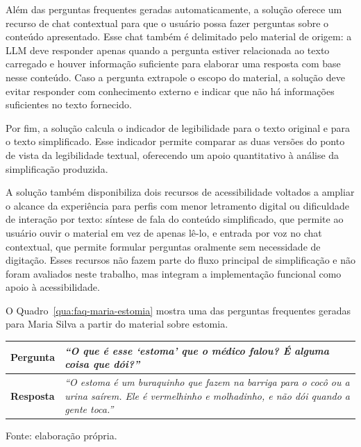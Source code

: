 Além das perguntas frequentes geradas automaticamente, a solução oferece um recurso de chat contextual para que o usuário possa fazer perguntas sobre o conteúdo apresentado. Esse chat também é delimitado pelo material de origem: a LLM deve responder apenas quando a pergunta estiver relacionada ao texto carregado e houver informação suficiente para elaborar uma resposta com base nesse conteúdo. Caso a pergunta extrapole o escopo do material, a solução deve evitar responder com conhecimento externo e indicar que não há informações suficientes no texto fornecido. 

Por fim, a solução calcula o indicador de legibilidade para o texto original e para o texto simplificado. Esse indicador permite comparar as duas versões do ponto de vista da legibilidade textual, oferecendo um apoio quantitativo à análise da simplificação produzida.

A solução também disponibiliza dois recursos de acessibilidade voltados a ampliar o alcance da experiência para perfis com menor letramento digital ou dificuldade de interação por texto: síntese de fala do conteúdo simplificado, que permite ao usuário ouvir o material em vez de apenas lê-lo, e entrada por voz no chat contextual, que permite formular perguntas oralmente sem necessidade de digitação. Esses recursos não fazem parte do fluxo principal de simplificação e não foram avaliados neste trabalho, mas integram a implementação funcional como apoio à acessibilidade. 

O Quadro~\ref{qua:faq-maria-estomia} mostra uma das perguntas frequentes geradas para Maria Silva a partir do material sobre estomia.

\begin{quadro}[htbp]
  \centering
  \caption{Exemplo de pergunta frequente gerada pela solução.}
  \label{qua:faq-maria-estomia}
  \small
  \renewcommand{\arraystretch}{1.2}

  \begin{tabularx}{0.92\textwidth}{p{} X}
    \toprule
    \textbf{Pergunta} &
    \textit{``O que é esse `estoma' que o médico falou? É alguma coisa que dói?''} \\
    \midrule
    \textbf{Resposta} &
    \textit{``O estoma é um buraquinho que fazem na barriga para o cocô ou a urina saírem. Ele é vermelhinho e molhadinho, e não dói quando a gente toca.''} \\
    \bottomrule
  \end{tabularx}

  \vspace{0.3em}
  {\small Fonte: elaboração própria.}
\end{quadro}

